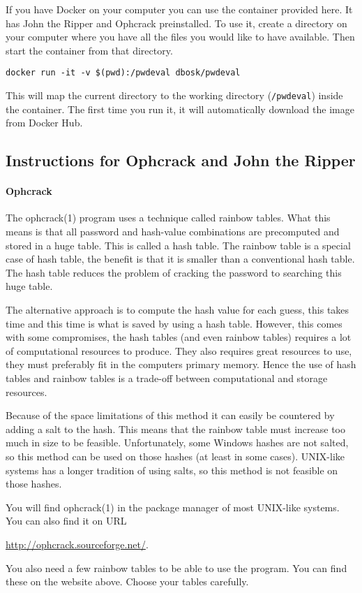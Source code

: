 If you have Docker on your computer you can use the container provided here.
It has John the Ripper and Ophcrack preinstalled.
To use it, create a directory on your computer where you have all the files you 
would like to have available.
Then start the container from that directory.
\begin{verbatim}
docker run -it -v $(pwd):/pwdeval dbosk/pwdeval
\end{verbatim}
This will map the current directory to the working directory (\verb'/pwdeval') 
inside the container.
The first time you run it, it will automatically download the image from Docker 
Hub.


\subsection{Instructions for Ophcrack and John the Ripper}

\paragraph{Ophcrack}

The ophcrack(1) program uses a technique called rainbow tables.
What this means is that all password and hash-value combinations are 
precomputed and stored in a huge table.
This is called a hash table.
The rainbow table is a special case of hash table, the benefit is that it is 
smaller than a conventional hash table.
The hash table reduces the problem of cracking the password to searching this 
huge table.

The alternative approach is to compute the hash value for each guess, this 
takes time and this time is what is saved by using a hash table.
However, this comes with some compromises, the hash tables (and even rainbow 
tables) requires a lot of computational resources to produce.
They also requires great resources to use, they must preferably fit in the 
computers primary memory.
Hence the use of hash tables and rainbow tables is a trade-off between 
computational and storage resources.

Because of the space limitations of this method it can easily be countered by 
adding a salt to the hash.
This means that the rainbow table must increase too much in size to be 
feasible.
Unfortunately, some Windows hashes are not salted, so this method can be used 
on those hashes (at least in some cases).
UNIX-like systems has a longer tradition of using salts, so this method is not 
feasible on those hashes.

You will find ophcrack(1) in the package manager of most UNIX-like systems.
You can also find it on URL
\begin{center}
  \url{http://ophcrack.sourceforge.net/}.
\end{center}
You also need a few rainbow tables to be able to use the program.
You can find these on the website above.
Choose your tables carefully.

